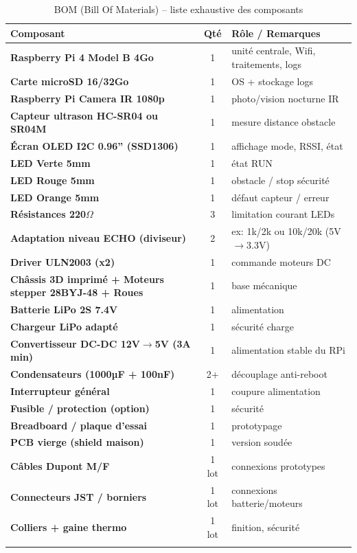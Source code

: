\documentclass[a4paper,12pt]{report}
\begin{document}
\begin{longtable}{|p{6cm}|c|p{6cm}|}
\hline
\rowcolor{UTSlate}\color{white}\textbf{Composant} & \color{white}\textbf{Qté} & \color{white}\textbf{Rôle / Remarques} \\ \hline
\endhead

\textbf{Raspberry Pi 4 Model B 4Go} & 1 & unité centrale, Wifi, traitements, logs \\ \hline
\textbf{Carte microSD 16/32Go} & 1 & OS + stockage logs \\ \hline
\textbf{Raspberry Pi Camera IR 1080p} & 1 & photo/vision nocturne IR \\ \hline
\textbf{Capteur ultrason HC-SR04 ou SR04M} & 1 & mesure distance obstacle \\ \hline
\textbf{Écran OLED I2C 0.96'' (SSD1306)} & 1 & affichage mode, RSSI, état \\ \hline
\textbf{LED Verte 5mm} & 1 & état RUN \\ \hline
\textbf{LED Rouge 5mm} & 1 & obstacle / stop sécurité \\ \hline
\textbf{LED Orange 5mm} & 1 & défaut capteur / erreur \\ \hline
\textbf{Résistances 220$\Omega$} & 3 & limitation courant LEDs \\ \hline
\textbf{Adaptation niveau ECHO (diviseur)} & 2 & ex: 1k/2k ou 10k/20k (5V$\rightarrow$3.3V) \\ \hline
\textbf{Driver ULN2003 (x2)} & 1 & commande moteurs DC \\ \hline
\textbf{Châssis 3D imprimé + Moteurs stepper 28BYJ-48 + Roues} & 1 & base mécanique \\ \hline
\textbf{Batterie LiPo 2S 7.4V} & 1 & alimentation \\ \hline
\textbf{Chargeur LiPo adapté} & 1 & sécurité charge \\ \hline
\textbf{Convertisseur DC-DC 12V$\rightarrow$5V (3A min)} & 1 & alimentation stable du RPi \\ \hline
\textbf{Condensateurs (1000µF + 100nF)} & 2+ & découplage anti-reboot \\ \hline
\textbf{Interrupteur général} & 1 & coupure alimentation \\ \hline
\textbf{Fusible / protection (option)} & 1 & sécurité \\ \hline
\textbf{Breadboard / plaque d’essai} & 1 & prototypage \\ \hline
\textbf{PCB vierge (shield maison)} & 1 & version soudée \\ \hline
\textbf{Câbles Dupont M/F} & 1 lot & connexions prototypes \\ \hline
\textbf{Connecteurs JST / borniers} & 1 lot & connexions batterie/moteurs \\ \hline
\textbf{Colliers + gaine thermo} & 1 lot & finition, sécurité \\ \hline

\caption{BOM (Bill Of Materials) – liste exhaustive des composants}
\end{longtable}
\end{document}
